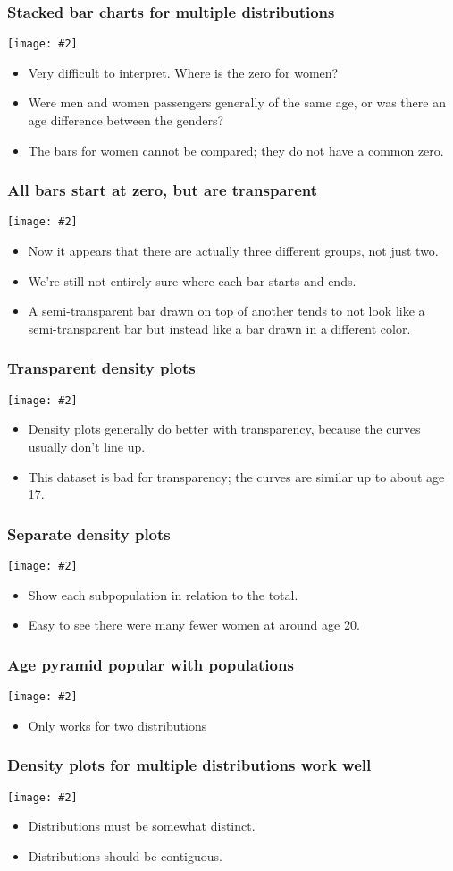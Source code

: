 \documentclass{beamer}
\newcommand{\bi}{\begin{itemize}}
\newcommand{\li}{\item}
\newcommand{\ei}{\end{itemize}}
\newcommand{\fig}[2]{\centerline{\texttt{[image: \#2]}}}
\newcommand{\bfr}[1]{\begin{frame}[fragile]\frametitle{{ #1 }}}
\begin{document}
\bfr{Stacked bar charts for multiple distributions}
\fig{.8}{titanic-age-stacked-hist-1.png}
\scriptsize
\bi
\li Very difficult to interpret.  Where is the zero for women?
\li Were men and women passengers generally of the same age, or was there an age difference between the genders?
\li The bars for women cannot be compared; they do not have a common zero.
\ei
\end{frame}
\scriptsize
\bfr{All bars start at zero, but are transparent}
\fig{0.8}{titanic-age-overlapping-hist-1.png}
\bi
\li Now it appears that there are actually three different groups, not just two.
\li We’re still not entirely sure where each bar starts and ends.
\li A semi-transparent bar drawn on top of another tends to not look like a semi-transparent bar but instead like a bar drawn in a different color.
\ei
\end{frame}


\bfr{Transparent density plots}
\fig{0.8}{titanic-age-overlapping-dens-1.png}
\bi
\li Density plots generally do better with transparency,
because the curves usually don't line up.
\li This dataset is bad for transparency; the curves
are similar up to about age 17.
\ei
\end{frame}

\bfr{Separate density plots}
\fig{1}{titanic-age-fractional-dens-1.png}
\bi
\li Show each subpopulation in relation to the total.
\li Easy to see there were many fewer women at around age 20.
\ei
\end{frame}

\bfr{Age pyramid popular with populations}
\fig{.8}{titanic-age-pyramid-1.png}

\bi
\li Only works for two distributions
\ei

\end{frame}

\bfr{Density plots for multiple distributions work well}
\fig{1}{butterfat-densitites-1.png}

\bi
\li Distributions must be somewhat distinct.
\li Distributions should be contiguous.
\ei

\end{frame}
\end{document}
